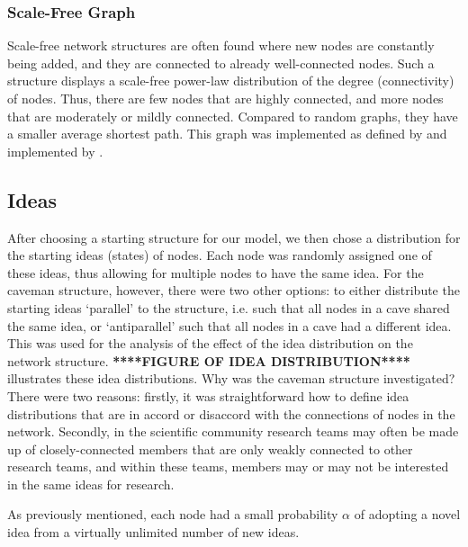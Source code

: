 \subsubsection{Scale-Free Graph}

Scale-free network structures are often found where new nodes are constantly being added, and they are connected to already well-connected nodes. Such a structure displays a scale-free power-law distribution of the degree (connectivity) of nodes. Thus, there are few nodes that are highly connected, and more nodes that are moderately or mildly connected. Compared to random graphs, they have a smaller average shortest path. This graph was implemented as defined by \citet*{BA1999} and implemented by \citet*{BS2011}.


\subsection{Ideas}

After choosing a starting structure for our model, we then chose a distribution for the starting ideas (states) of nodes. Each node was randomly assigned one of these ideas, thus allowing for multiple nodes to have the same idea. For the caveman structure, however, there were two other options: to either distribute the starting ideas `parallel' to the structure, i.e. such that all nodes in a cave shared the same idea, or `antiparallel' such that all nodes in a cave had a different idea. This was used for the analysis of the effect of the idea distribution on the network structure. \textbf{****FIGURE OF IDEA DISTRIBUTION****} illustrates these idea distributions. Why was the caveman structure investigated? There were two reasons: firstly, it was straightforward how to define idea distributions that are in accord or disaccord with the connections of nodes in the network. Secondly, in the scientific community research teams may often be made up of closely-connected members that are only weakly connected to other research teams, and within these teams, members may or may not be interested in the same ideas for research. 

As previously mentioned, each node had a small probability $\alpha$ of adopting a novel idea from a virtually unlimited number of new ideas.